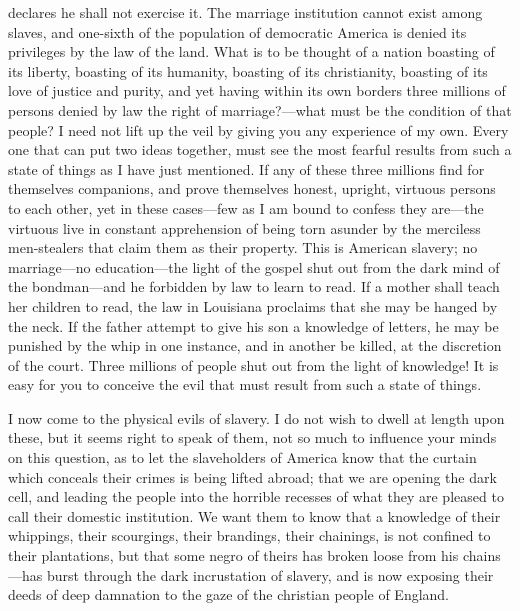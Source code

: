 declares he shall not exercise it. The marriage institution cannot exist
among slaves, and one-sixth of the population of democratic America is
denied its privileges by the law of the land. What is to be thought of a
nation boasting of its liberty, boasting of its humanity, boasting of
its christianity, boasting of its love of justice and purity, and yet
having within its own borders three millions of persons denied by law
the right of marriage?---what must be the condition of that people? I
need not lift up the veil by giving you any experience of my own. Every
one that can put two ideas together, must see the most fearful results
from such a state of things as I have just mentioned. If any of these
three millions find for themselves companions, and prove themselves
honest, upright, virtuous persons to each other, yet in these
cases---few as I am bound to confess they are---the virtuous live in
constant apprehension of being torn asunder by the merciless
men-stealers that claim them as their property. This is American
slavery; no marriage---no education---the light of the gospel shut out
from the dark mind of the bondman---and he forbidden by law to learn to
read. If a mother shall teach her children to read, the law in Louisiana
proclaims that she may be hanged by the neck. If the father attempt to
give his son a knowledge of letters, he may be punished by the whip in
one instance, and in another be killed, at the discretion of the court.
Three millions of people shut out from the light of knowledge! It is
easy for you to conceive the evil that must result from such a state of
things.

I now come to the physical evils of slavery. I do not wish to dwell at
length upon these, but it seems right to speak of them, not so much to
influence your minds on this question, as to let the slaveholders of
America know that the curtain which conceals their crimes is being
lifted abroad; that we are opening the dark cell, and leading the people
into the horrible recesses of what they are pleased to call their
domestic institution. We want them to know that a knowledge of their
whippings, their scourgings, their brandings, their chainings, is not
confined to their plantations, but that some negro of theirs has broken
loose from his chains---has burst through the dark incrustation of
slavery, and is now exposing their deeds of deep damnation to the gaze
of the christian people of England.

